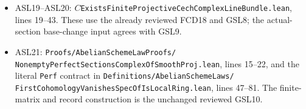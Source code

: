 \begin{itemize}
\item ASL19--ASL20:
$C$\texttt{Exists\allowbreak{}Finite\allowbreak{}Projective\allowbreak{}Cech\allowbreak{}Complex\allowbreak{}Line\allowbreak{}Bundle.lean},
lines 19--43.  These use the already reviewed FCD18 and GSL8;
the actual-section base-change input agrees with GSL9.
\item ASL21:
\texttt{Proofs/\allowbreak{}Abelian\allowbreak{}Scheme\allowbreak{}Law\allowbreak{}Proofs/\allowbreak{}}
\texttt{Nonempty\allowbreak{}Perfect\allowbreak{}Sections\allowbreak{}Complex\allowbreak{}Of\allowbreak{}Smooth\allowbreak{}Proj.lean},
lines 15--22, and the literal \texttt{Perf} contract in
\texttt{Definitions/\allowbreak{}Abelian\allowbreak{}Scheme\allowbreak{}Laws/\allowbreak{}}
\texttt{First\allowbreak{}Cohomology\allowbreak{}Vanishes\allowbreak{}Spec\allowbreak{}Of\allowbreak{}Is\allowbreak{}Local\allowbreak{}Ring.lean},
lines 47--81.  The finite-matrix and record construction is
the unchanged reviewed GSL10.
\end{itemize}
